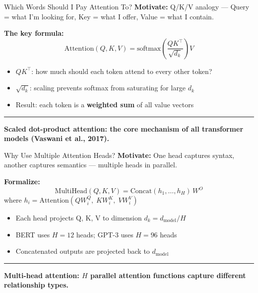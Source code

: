 \documentclass[8pt,aspectratio=169]{beamer}
\newcommand{\bottomnote}[1]{%
\vfill
\vspace{-2mm}
\textcolor{mllavender2}{\rule{\textwidth}{0.4pt}}
\vspace{1mm}
\footnotesize
\textbf{#1}
}
\newenvironment{compactlist}{%
  \begin{itemize}%
    \setlength{\itemsep}{2pt}%
    \setlength{\parskip}{0pt}%
    \setlength{\parsep}{0pt}%
}{%
  \end{itemize}%
}
\newcommand{\highlight}[1]{\textcolor{mlorange}{\textbf{#1}}}
\begin{document}
\begin{frame}{Which Words Should I Pay Attention To?}
\textbf{Motivate:} Q/K/V analogy --- Query = what I'm looking for, Key = what I offer, Value = what I contain.

\vspace{3mm}
\textbf{The key formula:}
\[
\text{Attention}(Q,K,V) = \text{softmax}\!\left(\frac{QK^{\!\top}}{\sqrt{d_k}}\right)V
\]

\vspace{2mm}
\begin{compactlist}
\item $QK^{\!\top}$: how much should each token attend to every other token?
\item $\sqrt{d_k}$: scaling prevents softmax from saturating for large $d_k$
\item Result: each token is a \highlight{weighted sum} of all value vectors
\end{compactlist}
\bottomnote{Scaled dot-product attention: the core mechanism of all transformer models (Vaswani et al., 2017).}
\end{frame}

\begin{frame}{Why Use Multiple Attention Heads?}
\textbf{Motivate:} One head captures syntax, another captures semantics --- multiple heads in parallel.

\vspace{3mm}
\textbf{Formalize:}
\[
\text{MultiHead}(Q,K,V) = \text{Concat}(h_1,\ldots,h_H)\,W^O
\]
where $h_i = \text{Attention}(QW_i^Q,\; KW_i^K,\; VW_i^V)$

\vspace{2mm}
\begin{compactlist}
\item Each head projects Q, K, V to dimension $d_k = d_{\text{model}} / H$
\item BERT uses $H = 12$ heads; GPT-3 uses $H = 96$ heads
\item Concatenated outputs are projected back to $d_{\text{model}}$
\end{compactlist}
\bottomnote{Multi-head attention: $H$ parallel attention functions capture different relationship types.}
\end{frame}
\end{document}
